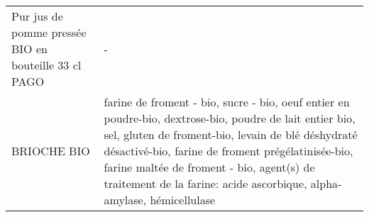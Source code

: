 \begin{longtable}{p{5cm}p{10cm}}
                                                     Pur jus de pomme pressée BIO en bouteille 33 cl PAGO &                                                                                                                                                                                                                                                                                                                                                                                                                                                                                                                                                                                                                                                                                                                                                                                                                                                                                                                                                                                                                                        - \\
                                                                                              BRIOCHE BIO &                                                                                                                                                                                                                                                                                                                                                                                                                                                                                                                                                                                                                                                                                                  farine de froment - bio, sucre - bio, oeuf entier en poudre-bio, dextrose-bio, poudre de lait entier bio, sel, gluten de froment-bio, levain de blé déshydraté désactivé-bio, farine de froment prégélatinisée-bio, farine maltée de froment - bio, agent(s) de traitement de la farine: acide ascorbique, alpha-amylase, hémicellulase \\

\end{longtable}
